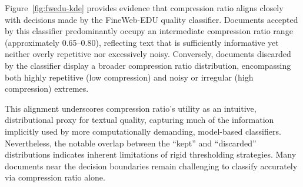 Figure~\ref{fig:fwedu-kde} provides evidence that compression ratio aligns closely with decisions made by the FineWeb-EDU quality classifier.
Documents accepted by this classifier predominantly occupy an intermediate compression ratio range (approximately 0.65--0.80), reflecting text that is sufficiently informative yet neither overly repetitive nor excessively noisy.
Conversely, documents discarded by the classifier display a broader compression ratio distribution, encompassing both highly repetitive (low compression) and noisy or irregular (high compression) extremes.

This alignment underscores compression ratio's utility as an intuitive, distributional proxy for textual quality, capturing much of the information implicitly used by more computationally demanding, model-based classifiers.
Nevertheless, the notable overlap between the ``kept'' and ``discarded'' distributions indicates inherent limitations of rigid thresholding strategies.
Many documents near the decision boundaries remain challenging to classify accurately via compression ratio alone.
